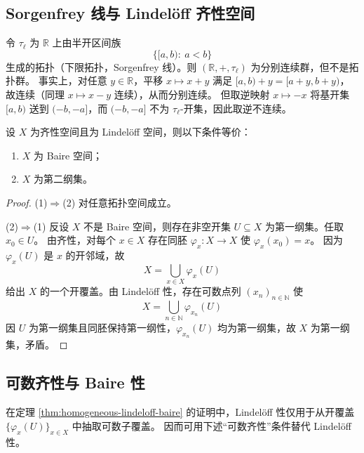 \documentclass[lang=cn,a4paper,newtx,figureplace=section,tableplace=section]{elegantbook}
\begin{document}
\subsection{Sorgenfrey 线与 Lindel\"off 齐性空间}

\begin{example}\label{ex:sorgenfrey-semitopological-not-topological}
  令 $\tau_\ell$ 为 $\mathbb R$ 上由半开区间族
  \[
    \{[a,b):\ a<b\}
  \]
  生成的拓扑（下限拓扑，Sorgenfrey 线）。则 $(\mathbb R,+,\tau_\ell)$ 为分别连续群，但不是拓扑群。
  事实上，对任意 $y\in\mathbb R$，平移 $x\mapsto x+y$ 满足 $[a,b)+y=[a+y,b+y)$，故连续（同理 $x\mapsto x-y$ 连续），从而分别连续。
  但取逆映射 $x\mapsto -x$ 将基开集 $[a,b)$ 送到 $(-b,-a]$，而 $(-b,-a]$ 不为 $\tau_\ell$-开集，因此取逆不连续。
\end{example}

\begin{theorem}\label{thm:homogeneous-lindeloff-baire}
  设 $X$ 为齐性空间且为 Lindel\"off 空间，则以下条件等价：
  \begin{enumerate}[(1)]
    \item $X$ 为 Baire 空间；
    \item $X$ 为第二纲集。
  \end{enumerate}
\end{theorem}
\begin{proof}
  (1)$\Rightarrow$(2) 对任意拓扑空间成立。

  (2)$\Rightarrow$(1) 反设 $X$ 不是 Baire 空间，则存在非空开集 $U\subseteq X$ 为第一纲集。任取 $x_0\in U$。
  由齐性，对每个 $x\in X$ 存在同胚 $\varphi_x:X\to X$ 使 $\varphi_x(x_0)=x$。
  因为 $\varphi_x(U)$ 是 $x$ 的开邻域，故
  \[
    X=\bigcup_{x\in X}\varphi_x(U)
  \]
  给出 $X$ 的一个开覆盖。由 Lindel\"off 性，存在可数点列 $(x_n)_{n\in\mathbb N}$ 使
  \[
    X=\bigcup_{n\in\mathbb N}\varphi_{x_n}(U)
  \]
  因 $U$ 为第一纲集且同胚保持第一纲性，$\varphi_{x_n}(U)$ 均为第一纲集，故 $X$ 为第一纲集，矛盾。
\end{proof}

\subsection{可数齐性与 Baire 性}

\begin{remark}
  在定理 \ref{thm:homogeneous-lindeloff-baire} 的证明中，Lindel\"off 性仅用于从开覆盖 $\{\varphi_x(U)\}_{x\in X}$ 中抽取可数子覆盖。
  因而可用下述“可数齐性”条件替代 Lindel\"off 性。
\end{remark}
\end{document}
